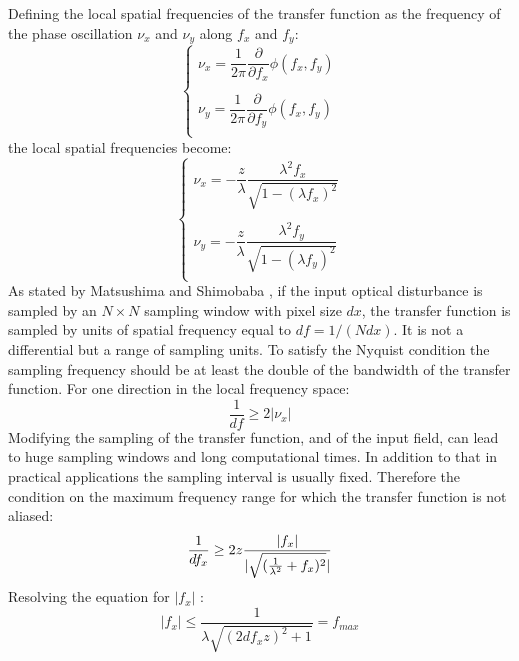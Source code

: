  \newpage
 Defining the local spatial frequencies of the transfer function \cite{goodman2005introduction,matsushima2009band} as the frequency of the phase oscillation $\nu_x$ and $\nu_y$ along $f_x$ and $f_y$:
 \begin{equation}
 	\label{eq:BL3}
 	\begin{cases} \nu_x=\dfrac{1}{2\pi}\dfrac{\partial}{\partial f_x}\phi(f_x,f_y)\\
 	\\
 	 \nu_y=\dfrac{1}{2\pi}\dfrac{\partial}{\partial f_y}\phi(f_x,f_y)\\ \end{cases}
 \end{equation}
 the local spatial frequencies become:
 \begin{equation}
 \label{eq:BL16}
 \begin{cases} \nu_x=-\dfrac{z}{\lambda}\dfrac{\lambda^2 f_x}{\sqrt{1-(\lambda f_x)^2}}\\
 \\
 \nu_y=-\dfrac{z}{\lambda}\dfrac{\lambda^2 f_y}{\sqrt{1-(\lambda f_y)^2}}\\ \end{cases}
 \end{equation}
 As stated by Matsushima and Shimobaba \cite{matsushima2009band}, if the input optical disturbance is sampled by an $N \times N$ sampling window with pixel size $dx$, the transfer function is sampled by units of spatial frequency equal to $df=1/(N dx)$. It is not a differential but a range of sampling units. To satisfy the Nyquist condition the sampling frequency should be at least the double of the bandwidth of the transfer function. For one direction in the local frequency space:
 \begin{equation}
 \label{eq:BL4}
 \dfrac{1}{df}\geq 2|\nu_x|
 \end{equation}
 Modifying the sampling of the transfer function, and of the input field, can lead to huge sampling windows and long computational times. In addition to that in practical applications the sampling interval is usually fixed. Therefore the condition on the maximum frequency range for which the transfer function is not aliased:
 \begin{equation}
 \label{eq:BL5}
 \dfrac{1}{df_x}\geq 2 z\dfrac{|f_x|}{|\sqrt{(\frac{1}{\lambda^2}+f_x)^2}|}\\ 
 \end{equation}
 Resolving the equation for $|f_x|$ :
 \begin{equation}
 \label{eq:BL6}
 |f_x|\leq\dfrac{1}{\lambda\sqrt{(2df_x z)^2+1}} = f_{max}
 \end{equation}
